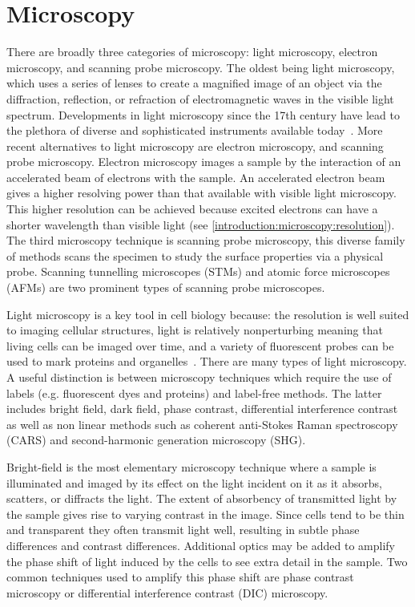 \section{Microscopy}
\label{introduction:microscopy}
There are broadly three categories of microscopy: light microscopy, electron microscopy, and scanning probe microscopy. The oldest being light microscopy, which uses a series of lenses to create a magnified image of an object via the diffraction, reflection, or refraction of electromagnetic waves in the visible light spectrum. Developments in light microscopy since the 17th century have lead to the plethora of diverse and sophisticated instruments available today~\cite{Spector2006}. More recent alternatives to light microscopy are electron microscopy, and scanning probe microscopy. Electron microscopy images a sample by the interaction of an accelerated beam of electrons with the sample. An accelerated electron beam gives a higher resolving power than that available with visible light microscopy. This higher resolution can be achieved because excited electrons can have a shorter wavelength than visible light (see \autoref{introduction:microscopy:resolution}). The third microscopy technique is scanning probe microscopy, this diverse family of methods scans the specimen to study the surface properties via a physical probe. Scanning tunnelling microscopes (STMs) and atomic force microscopes (AFMs) are two prominent types of scanning probe microscopes.

Light microscopy is a key tool in cell biology because: the resolution is well suited to imaging cellular structures, light is relatively nonperturbing meaning that living cells can be imaged over time, and a variety of fluorescent probes can be used to  mark proteins and organelles~\cite{Thorn2016}. There are many types of light microscopy. A useful distinction is between microscopy techniques which require the use of labels (e.g. fluorescent dyes and proteins) and label-free methods. The latter includes bright field, dark field, phase contrast, differential interference contrast as well as non linear methods such as coherent anti-Stokes Raman spectroscopy (CARS) and second-harmonic generation microscopy (SHG).

Bright-field is the most elementary microscopy technique where a sample is illuminated and imaged by its effect on the light incident on it as it absorbs, scatters, or diffracts the light. The extent of absorbency of transmitted light by the sample gives rise to varying contrast in the image. Since cells tend to be thin and transparent they often transmit light well, resulting in subtle phase differences and contrast differences. Additional optics may be added to amplify the phase shift of light induced by the cells to see extra detail in the sample. Two common techniques used to amplify this phase shift are phase contrast microscopy or differential interference contrast (DIC) microscopy.

